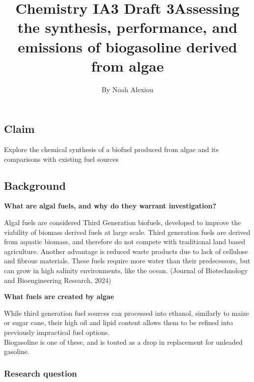 \documentclass[10pt,a4paper]{article}
\title{Chemistry IA3 Draft 3}
\author{}
\date{}
\begin{document}
	\begin{titlepage}
		\title{Assessing the synthesis, performance, and emissions of biogasoline derived from algae}
		\vfill
		\author{By Noah Alexiou}
	\end{titlepage}
	\maketitle
	
	\newpage
	
	
	\tableofcontents
	\newpage
	\subsection{Claim}\label{claim}
	
	Explore the chemical synthesis of a biofuel produced from algae and its
	comparisons with existing fuel sources

	\subsection{Background}\label{background}
	
	
	\textbf{What are algal fuels, and why do they warrant investigation?}\label{why-are-algal-fuels-being-investigated}
	
	Algal fuels are considered \textquotesingle Third
	Generation\textquotesingle{} biofuels, developed to improve the
	viability of biomass derived fuels at large scale. Third generation
	fuels are derived from aquatic biomass, and therefore do not compete
	with traditional land based agriculture. Another advantage is reduced
	waste products due to lack of cellulose and fibrous materials. These
	fuels require more water than their predecessors, but can grow in high
	salinity environments, like the ocean.	(Journal of Biotechnology and Bioengineering Research, 2024)

	
	\textbf{What fuels are created by
		algae}\label{what-fuels-are-created-by-algae}
	
	While third generation fuel sources can processed into ethanol,
	similarly to maize or sugar cane, their high oil and lipid content
	allows them to be refined into previously impractical fuel options.\\
	Biogasoline is one of these, and is touted as a \textquotesingle drop in
	replacement\textquotesingle{} for unleaded gasoline. 
	\subsubsection{Research question}\label{research-question}
	
\end{document}
